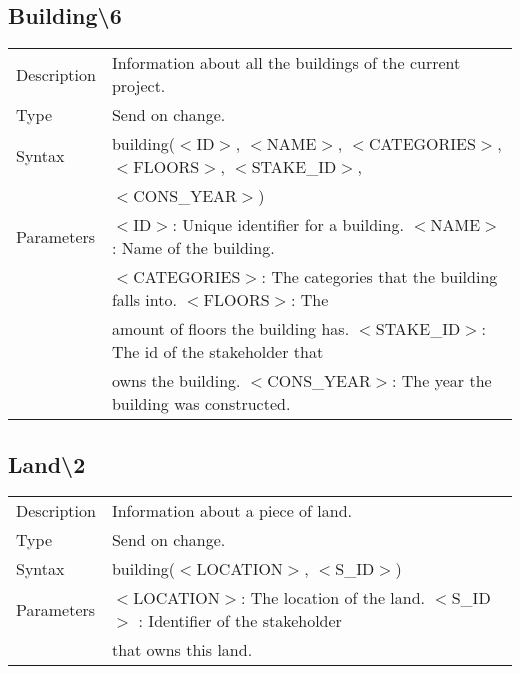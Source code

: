 \documentclass{article}
\begin{document}
\subsection*{Building\textbackslash6}

\begin{tabular}{ l l }
  Description & Information about all the buildings of the current project.  \\
  Type & Send on change. \\
  Syntax & building($<$ID$>$, $<$NAME$>$, $<$CATEGORIES$>$, $<$FLOORS$>$, $<$STAKE\_ID$>$, \\
    & $<$CONS\_YEAR$>$) \\
  Parameters &  $<$ID$>$: Unique identifier for a building. $<$NAME$>$ : Name of the building. \\
    & $<$CATEGORIES$>$: The categories that the building falls into. $<$FLOORS$>$:  The \\
    & amount of floors the building has. $<$STAKE\_ID$>$: The id of the stakeholder that \\
    & owns the building. $<$CONS\_YEAR$>$: The year the building was constructed.
\end{tabular}

\subsection*{Land\textbackslash2}

\begin{tabular}{ l l }
  Description & Information about a piece of land.  \\
  Type & Send on change. \\
  Syntax & building($<$LOCATION$>$, $<$S\_ID$>$) \\
  Parameters &  $<$LOCATION$>$: The location of the land. $<$S\_ID$>$ : Identifier of the stakeholder \\
    &  that owns this land.
\end{tabular}
\end{document}
